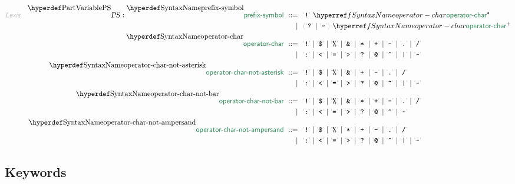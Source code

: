 \begin{align*}
  \KEY{Lexis} \quad
    \VARDECL{PS} : \SYNDECL{prefix-symbol}
      \ ::= \ & \
      \LEX{{!}} \ \SYNREF{operator-char}\STAR \\
      \ \mid \ & \ \LEFTGROUP \LEX{{?}} \mid \LEX{{\TILDE}} \RIGHTGROUP \ \SYNREF{operator-char}\PLUS
    \\
     \SYNDECL{operator-char}
      \ ::= \ & \
      \LEX{{!}} \mid \LEX{{\DOLLAR}} \mid \LEX{{\PERCENT}} \mid \LEX{{\AMPERSAND}} \mid \LEX{{*}} \mid \LEX{{+}} \mid \LEX{{-}} \mid \LEX{{.}} \mid \LEX{{/}} \\
      \ \mid \ & \ \LEX{{:}} \mid \LEX{{<}} \mid \LEX{{=}} \mid \LEX{{>}} \mid \LEX{{?}} \mid \LEX{{@}} \mid \LEX{{\CARET}} \mid \LEX{{|}} \mid \LEX{{\TILDE}}
    \\
     \SYNDECL{operator-char-not-asterisk}
      \ ::= \ & \
      \LEX{{!}} \mid \LEX{{\DOLLAR}} \mid \LEX{{\PERCENT}} \mid \LEX{{\AMPERSAND}} \mid \LEX{{+}} \mid \LEX{{-}} \mid \LEX{{.}} \mid \LEX{{/}} \\
      \ \mid \ & \ \LEX{{:}} \mid \LEX{{<}} \mid \LEX{{=}} \mid \LEX{{>}} \mid \LEX{{?}} \mid \LEX{{@}} \mid \LEX{{\CARET}} \mid \LEX{{|}} \mid \LEX{{\TILDE}}
    \\
     \SYNDECL{operator-char-not-bar}
      \ ::= \ & \
      \LEX{{!}} \mid \LEX{{\DOLLAR}} \mid \LEX{{\PERCENT}} \mid \LEX{{\AMPERSAND}} \mid \LEX{{*}} \mid \LEX{{+}} \mid \LEX{{-}} \mid \LEX{{.}} \mid \LEX{{/}} \\
      \ \mid \ & \ \LEX{{:}} \mid \LEX{{<}} \mid \LEX{{=}} \mid \LEX{{>}} \mid \LEX{{?}} \mid \LEX{{@}} \mid \LEX{{\CARET}} \mid \LEX{{\TILDE}}
    \\
     \SYNDECL{operator-char-not-ampersand}
      \ ::= \ & \
      \LEX{{!}} \mid \LEX{{\DOLLAR}} \mid \LEX{{\PERCENT}} \mid \LEX{{*}} \mid \LEX{{+}} \mid \LEX{{-}} \mid \LEX{{.}} \mid \LEX{{/}} \\
      \ \mid \ & \ \LEX{{:}} \mid \LEX{{<}} \mid \LEX{{=}} \mid \LEX{{>}} \mid \LEX{{?}} \mid \LEX{{@}} \mid \LEX{{\CARET}} \mid \LEX{{|}} \mid \LEX{{\TILDE}}
\end{align*}
\subsection{Keywords}\hypertarget{keywords}{}\label{keywords}

